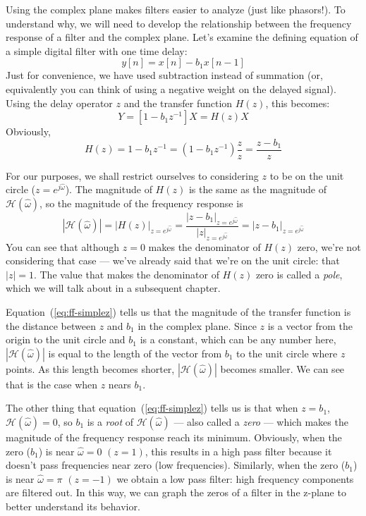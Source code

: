 Using the complex plane makes filters easier to analyze (just like phasors!). To understand why, we will need to develop the relationship between the frequency response of a filter and the complex plane. Let's examine the defining equation of a simple digital filter with
one time delay:
\begin{equation}
y[n] = x[n]-b_1x[n-1]
\end{equation}
Just for convenience, we have used subtraction instead of summation
(or, equivalently you can think of using a negative weight on the
delayed signal). Using the delay operator $z$ and the transfer
function $H(z)$, this becomes:
\begin{equation}
Y = [1-b_1z^{-1}]X = H(z)X
\end{equation}
Obviously,
\begin{equation}
H(z) = 1-b_1z^{-1} = (1-b_1z^{-1}) \frac{z}{z} = \frac{z-b_1}{z}
\end{equation}

For our purposes, we shall restrict ourselves to considering $z$ to be
on the unit circle ($z=e^{j\hat{\omega}}$). The magnitude of $H(z)$ is
the same as the magnitude of $\mathcal{H}(\hat{\omega})$, so the
magnitude of the frequency response is
\begin{equation}
|\mathcal{H}(\hat{\omega})| = |H(z)|_{z=e^{j\hat{\omega}}}
       = \frac{|z-b_1|_{z=e^{j\hat{\omega}}}}{|z|_{z=e^{j\hat{\omega}}}}
       = |z-b_1|_{z=e^{j\hat{\omega}}}
\label{eq:ff-simplez}
\end{equation}
You can see that
although $z=0$ makes the denominator of $H(z)$ zero, we're not
considering that case --- we've already said that we're on the unit
circle: that $|z|=1$.  The value that makes the denominator of
$H(z)$ zero is called a \emph{pole}, which we will talk
about in a subsequent chapter.

Equation~(\ref{eq:ff-simplez}) tells us that the magnitude of the
transfer function is the distance between $z$ and $b_1$ in the complex
plane.  Since $z$ is a vector from the origin to the unit circle and
$b_1$ is a constant, which can be any number here,
$|\mathcal{H}(\hat{\omega})|$ is equal to the length of the vector
from $b_1$ to the unit circle where $z$ points. As this length becomes
shorter, $|\mathcal{H}(\hat{\omega})|$ becomes smaller. We can see
that is the case when $z$ nears $b_1$.

The other thing that equation~(\ref{eq:ff-simplez}) tells us is that
when $z=b_1$, $\mathcal{H}(\hat{\omega})=0$, so $b_1$ is a \emph{root}
of $\mathcal{H}(\hat{\omega})$ --- also called a \emph{zero} --- which
makes the magnitude of the frequency response reach its
minimum.
Obviously, when the zero ($b_1$) is near $\hat{\omega}=0$ $(z=1)$,
this results in a high pass filter because it doesn't pass frequencies
near zero (low frequencies). Similarly, when the zero ($b_1$) is near
$\hat{\omega}=\pi$ $(z=-1)$ we obtain a low pass filter: high frequency
components are filtered out. In this way, we can graph the zeros of a filter in the z-plane to better understand its behavior. 

